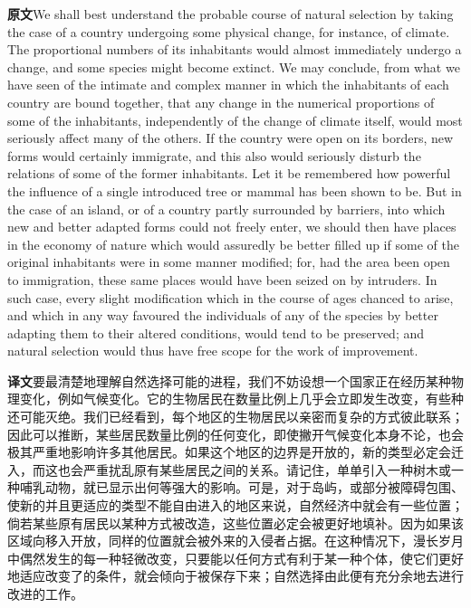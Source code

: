 \documentclass[UTF8,zihao=-4]{ctexart}
\newcommand{\BodyFont}{\fontsize{10.5pt}{15.5pt}\selectfont}
\newcommand{\origlabel}{\textbf{原文}\quad}
\newcommand{\translabel}{\textbf{译文}\quad}
\newenvironment{enblock}{\par\noindent\begingroup\BodyFont\origlabel}{\par\endgroup}
\newenvironment{zhblock}{\par\noindent\begingroup\BodyFont\translabel}{\par\endgroup\vspace{0.35em}}
\newcommand{\pair}[2]{\begin{enblock}#1\end{enblock}\begin{zhblock}#2\end{zhblock}}
\begin{document}
\pair{We shall best understand the probable course of natural selection by taking the case of a country undergoing some physical change, for instance, of climate. The proportional numbers of its inhabitants would almost immediately undergo a change, and some species might become extinct. We may conclude, from what we have seen of the intimate and complex manner in which the inhabitants of each country are bound together, that any change in the numerical proportions of some of the inhabitants, independently of the change of climate itself, would most seriously affect many of the others. If the country were open on its borders, new forms would certainly immigrate, and this also would seriously disturb the relations of some of the former inhabitants. Let it be remembered how powerful the influence of a single introduced tree or mammal has been shown to be. But in the case of an island, or of a country partly surrounded by barriers, into which new and better adapted forms could not freely enter, we should then have places in the economy of nature which would assuredly be better filled up if some of the original inhabitants were in some manner modified; for, had the area been open to immigration, these same places would have been seized on by intruders. In such case, every slight modification which in the course of ages chanced to arise, and which in any way favoured the individuals of any of the species by better adapting them to their altered conditions, would tend to be preserved; and natural selection would thus have free scope for the work of improvement.}{要最清楚地理解自然选择可能的进程，我们不妨设想一个国家正在经历某种物理变化，例如气候变化。它的生物居民在数量比例上几乎会立即发生改变，有些种还可能灭绝。我们已经看到，每个地区的生物居民以亲密而复杂的方式彼此联系；因此可以推断，某些居民数量比例的任何变化，即使撇开气候变化本身不论，也会极其严重地影响许多其他居民。如果这个地区的边界是开放的，新的类型必定会迁入，而这也会严重扰乱原有某些居民之间的关系。请记住，单单引入一种树木或一种哺乳动物，就已显示出何等强大的影响。可是，对于岛屿，或部分被障碍包围、使新的并且更适应的类型不能自由进入的地区来说，自然经济中就会有一些位置；倘若某些原有居民以某种方式被改造，这些位置必定会被更好地填补。因为如果该区域向移入开放，同样的位置就会被外来的入侵者占据。在这种情况下，漫长岁月中偶然发生的每一种轻微改变，只要能以任何方式有利于某一种个体，使它们更好地适应改变了的条件，就会倾向于被保存下来；自然选择由此便有充分余地去进行改进的工作。}
\end{document}

